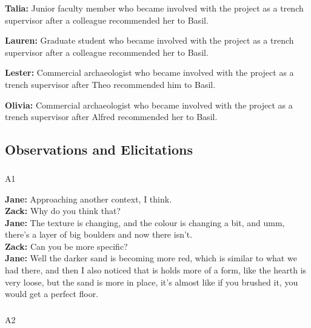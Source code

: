 \documentclass[
]{article}
\makeatletter
\let\oldsubparagraph\subparagraph
\renewcommand{\subparagraph}{
    \@ifstar
      \xxxSubParagraphStar
      \xxxSubParagraphNoStar
  }
\newcommand{\xxxSubParagraphStar}[1]{\oldsubparagraph*{#1}\mbox{}}
\newcommand{\xxxSubParagraphNoStar}[1]{\oldsubparagraph{#1}\mbox{}}
\makeatother
\begin{document}
\textbf{Talia:} Junior faculty member who became involved with the
project as a trench supervisor after a colleague recommended her to
Basil.

\textbf{Lauren:} Graduate student who became involved with the project
as a trench supervisor after a colleague recommended her to Basil.

\textbf{Lester:} Commercial archaeologist who became involved with the
project as a trench supervisor after Theo recommended him to Basil.

\textbf{Olivia:} Commercial archaeologist who became involved with the
project as a trench supervisor after Alfred recommended her to Basil.

\subsection{Observations and
Elicitations}\label{observations-and-elicitations}

\subparagraph{A1}\label{sec-A1}

\textbf{Jane:} Approaching another context, I think.\\
\textbf{Zack:} Why do you think that?\\
\textbf{Jane:} The texture is changing, and the colour is changing a
bit, and umm, there's a layer of big boulders and now there isn't.\\
\textbf{Zack:} Can you be more specific?\\
\textbf{Jane:} Well the darker sand is becoming more red, which is
similar to what we had there, and then I also noticed that is holds more
of a form, like the hearth is very loose, but the sand is more in place,
it's almost like if you brushed it, you would get a perfect floor.

\subparagraph{A2}\label{sec-A2}
\end{document}

